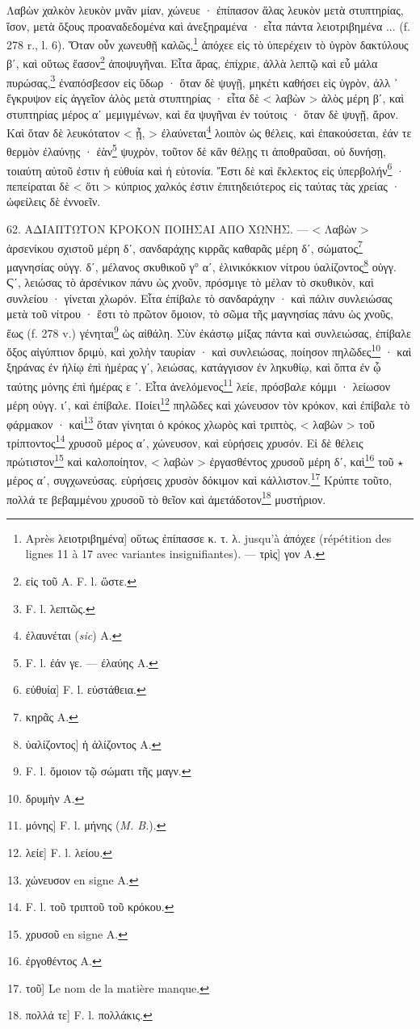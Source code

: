 \documentclass[a4paper, 11pt, oneside, polutonikogreek, french]{article}
\begin{document}
Λαβὼν χαλκὸν λευκὸν μνᾶν μίαν, χώνευε · ἐπίπασον ἅλας λευκὸν μετὰ στυπτηρίας, ἴσον, μετὰ ὄξους προαναδεδομένα καὶ ἀνεξηραμένα · εἶτα πάντα λειοτριβημένα ... (f. 278 r., l. 6). Ὅταν οὖν χωνευθῇ καλῶς,\footnote{Après λειοτριβημένα] οὕτως ἐπίπασσε κ. τ. λ. jusqu'à ἀπόχεε (répétition des lignes 11 à 17 avec variantes insignifiantes). --- τρὶς] γον A.} ἀπόχεε εἰς τὸ ὑπερέχειν τὸ ὑγρὸν δακτύλους βʹ, καὶ οὕτως ἔασον\footnote{εἰς τοῦ A. F. l. ὥστε.} ἀποψυγῆναι. Εἶτα ἄρας, ἐπίχριε, ἀλλὰ λεπτῷ καὶ εὖ μάλα πυρώσας,\footnote{F. l. λεπτῶς.} ἐναπόσβεσον εἰς ὕδωρ · ὅταν δὲ ψυγῇ, μηκέτι καθήσει εἰς ὑγρὸν, ἀλλ ᾽ ἔγκρυψον εἰς ἀγγεῖον ἀλὸς μετὰ στυπτηρίας · εἶτα δὲ < λαβὼν > ἀλὸς μέρη βʹ, καὶ στυπτηρίας μέρος αʹ μεμιγμένων, καὶ ἔα ψυγῆναι ἐν τούτοις · ὅταν δὲ ψυγῇ, ἄρον. Καὶ ὅταν δὲ λευκότατον < ᾖ, > ἐλαύνεται\footnote{ἐλαυνέται (\emph{sic}) A.} λοιπὸν ὡς θέλεις, καὶ ἐπακούσεται, ἐάν τε θερμὸν ἐλαύνῃς · ἐὰν\footnote{F. l. ἐάν γε. --- ἐλαύης A.} ψυχρὸν, τοῦτον δὲ κἂν θέλῃς τι ἀποθραῦσαι, οὐ δυνήσῃ, τοιαύτη αὐτοῦ ἐστιν ἡ εὐθυία καὶ ἡ εὐτονία. Ἔστι δὲ καὶ ἔκλεκτος εἰς ὑπερβολήν\footnote{εὐθυία] F. l. εὐστάθεια.} · πεπείραται δὲ < ὅτι > κύπριος χαλκός ἐστιν ἐπιτηδειότερος εἰς ταύτας τὰς χρείας · ὠφείλεις δὲ ἐννοεῖν.

62. ΑΔΙΑΠΤΩΤΟΝ ΚΡΟΚΟΝ ΠΟΙΗΣΑΙ ΑΠΟ ΧΩΝΗΣ. --- < Λαβὼν > ἀρσενίκου σχιστοῦ μέρη δʹ, σανδαράχης κιρρᾶς καθαρᾶς μέρη δʹ, σώματος\footnote{κηρᾶς A.} μαγνησίας οὐγγ. δʹ, μέλανος σκυθικοῦ γ° αʹ, ἑλινικόκκιον νίτρου ὑαλίζοντος\footnote{ὑαλίζοντος] ἡ ἁλίζοντος A.} οὐγγ. Ϛʹ, λειώσας τὸ ἀρσένικον πάνυ ὡς χνοῦν, πρόσμιγε τὸ μέλαν τὸ σκυθικὸν, καὶ συνλείου · γίνεται χλωρόν. Εἶτα ἐπίβαλε τὸ σανδαράχην · καὶ πάλιν συνλειώσας μετὰ τοῦ νίτρου · ἔστι τὸ πρῶτον ὅμοιον, τὸ σῶμα τῆς μαγνησίας πάνυ ὡς χνοῦς, ἕως (f. 278 v.) γένηται\footnote{F. l. ὅμοιον τῷ σώματι τῆς μαγν.} ὡς αἰθάλη. Σὺν ἐκάστῳ μίξας πάντα καὶ συνλειώσας, ἐπίβαλε ὄξος αἰγύπτιον δριμὺ, καὶ χολὴν ταυρίαν · καὶ συνλειώσας, ποίησον πηλῶδες\footnote{δρυμὴν A.} · καὶ ξηράνας ἐν ἡλίῳ ἐπὶ ἡμέρας γʹ, λειώσας, κατάγγισον ἐν ληκυθίῳ, καὶ ὄπτα ἐν ᾧ ταύτης μόνης ἐπὶ ἡμέρας ε ᾽. Εἶτα ἀνελόμενος\footnote{μόνης] F. l. μήνης (\emph{M. B.}).} λείε, πρόσβαλε κόμμι · λείωσον μέρη οὐγγ. ιʹ, καὶ ἐπίβαλε. Ποίει\footnote{λείε] F. l. λείου.} πηλῶδες καὶ χώνευσον τὸν κρόκον, καὶ ἐπίβαλε τὸ φάρμακον · καὶ\footnote{χώνευσον en signe A.} ὅταν γίνηται ὁ κρόκος χλωρὸς καὶ τριπτὸς, < λαβὼν > τοῦ τρίπτοντος\footnote{F. l. τοῦ τριπτοῦ τοῦ κρόκου.} χρυσοῦ μέρος αʹ, χώνευσον, καὶ εὑρήσεις χρυσόν. Εἰ δὲ θέλεις πρώτιστον\footnote{χρυσοῦ en signe A.} καὶ καλοποίητον, < λαβὼν > ἐργασθέντος χρυσοῦ μέρη δʹ, καὶ\footnote{ἐργοθέντος A.} τοῦ $\star$ μέρος αʹ, συγχωνεύσας. εὑρήσεις χρυσὸν δόκιμον καὶ κάλλιστον.\footnote{τοῦ] Le nom de la matière manque.} Κρύπτε τοῦτο, πολλά τε βεβαμμένου χρυσοῦ τὸ θεῖον καὶ ἀμετάδοτον\footnote{πολλά τε] F. l. πολλάκις.} μυστήριον.
\end{document}

